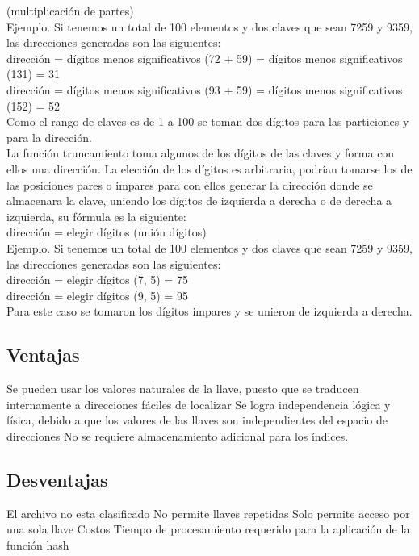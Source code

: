 \documentclass[letterpaper,openright,12pt]{report}
\begin{document}
(multiplicación de partes)\\[0.4cm] Ejemplo. Si tenemos un total de 100
elementos y dos claves que sean 7259 y 9359, las direcciones generadas
son las siguientes:\\ dirección = dígitos menos significativos (72 + 59)
= dígitos menos significativos (131) = 31\\ dirección = dígitos menos
significativos (93 + 59) = dígitos menos significativos (152) = 52\\[0.4cm]
Como el rango de claves es de 1 a 100 se toman dos dígitos para las
particiones y para la dirección.\\ La función truncamiento toma algunos
de los dígitos de las claves y forma con ellos una dirección. La
elección de los dígitos es arbitraria, podrían tomarse los de las
posiciones pares o impares para con ellos generar la dirección donde se
almacenara la clave, uniendo los dígitos de izquierda a derecha o de
derecha a izquierda, su fórmula es la siguiente:\\[0.4cm] dirección = elegir
dígitos (unión dígitos)\\ Ejemplo. Si tenemos un total de 100 elementos
y dos claves que sean 7259 y 9359, las direcciones generadas son las
siguientes:\\ dirección = elegir dígitos (7, 5) = 75\\ dirección =
elegir dígitos (9, 5) = 95\\[0.4cm] Para este caso se tomaron los dígitos
impares y se unieron de izquierda a derecha.

\subsection{Ventajas}

Se pueden usar los valores naturales de la llave, puesto que se traducen
internamente a direcciones fáciles de localizar Se logra independencia
lógica y física, debido a que los valores de las llaves son
independientes del espacio de direcciones No se requiere almacenamiento
adicional para los índices.

\subsection{Desventajas}

El archivo no esta clasificado No permite llaves repetidas Solo permite
acceso por una sola llave Costos Tiempo de procesamiento requerido para
la aplicación de la función hash
\newpage
\end{document}
